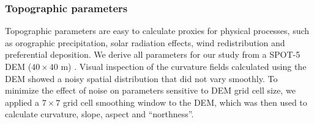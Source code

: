 \documentclass[twocolumn, letterpaper]{igs}
\begin{document}
\subsubsection{Topographic parameters}

Topographic parameters are easy to calculate proxies for physical processes, such as orographic precipitation, solar radiation effects, wind redistribution and preferential deposition. We derive all parameters for our study from a SPOT-5 DEM ($40\times40$ m) \citep{Korona2009}. Visual inspection of the curvature fields calculated using the DEM showed a noisy spatial distribution that did not vary smoothly. To minimize the effect of noise on parameters sensitive to DEM grid cell size, we applied a $7\times7$ grid cell smoothing window to the DEM, which was then used to calculate curvature, slope, aspect and ``northness''.
\end{document}
